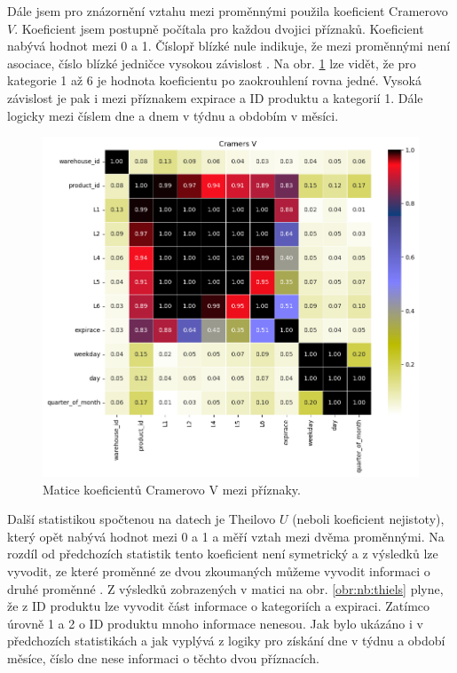 Dále jsem pro znázornění vztahu mezi proměnnými použila koeficient Cramerovo $V$. Koeficient jsem postupně počítala pro každou dvojici příznaků. Koeficient nabývá hodnot mezi 0 a 1. Číslopř blízké nule indikuje, že mezi proměnnými není asociace, číslo blízké jedničce vysokou závislost \cite{bib:statology}. Na obr. \ref*{obr:nb:cramers} lze vidět, že pro kategorie 1 až 6 je hodnota koeficientu  po zaokrouhlení rovna jedné. Vysoká závislost je pak i mezi příznakem expirace a ID produktu a kategorií 1. Dále logicky mezi číslem dne a dnem v týdnu a obdobím v měsíci.

\begin{figure}[hbtp!]
    \centering
    \includegraphics[width=.8\textwidth]{obrazky/zntb/cramers_u.png}
    \caption{Matice koeficientů Cramerovo V mezi příznaky.}
    \label{obr:nb:cramers}
\end{figure}

Další statistikou spočtenou na datech je Theilovo $U$ (neboli koeficient nejistoty), který opět nabývá hodnot mezi 0 a 1 a měří vztah mezi dvěma proměnnými. Na rozdíl od předchozích statistik tento koeficient není symetrický a z výsledků lze vyvodit, ze které proměnné ze dvou zkoumaných můžeme vyvodit informaci o druhé proměnné \cite{bib:correl}. Z výsledků zobrazených v matici na obr. \ref*{obr:nb:thiels} plyne, že z ID produktu lze vyvodit část informace o kategoriích a expiraci. Zatímco úrovně 1 a 2 o ID produktu mnoho informace nenesou. Jak bylo ukázáno i v předchozích statistikách a jak vyplývá z logiky pro získání dne v týdnu a období měsíce, číslo dne nese informaci o těchto dvou příznacích.

